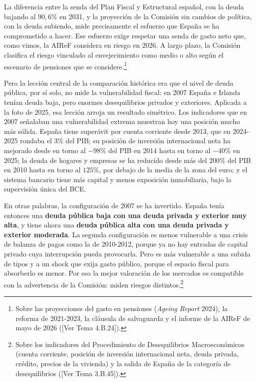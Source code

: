 \documentclass[10pt,a4paper]{article}
\newcommand{\authorfont}[1]{{\fontfamily{EBGaramond-TLF}\selectfont #1}}
\begin{document}
La diferencia entre la senda del Plan Fiscal y Estructural español, con la deuda bajando al $90,6\%$ en 2031, y la proyección de la Comisión sin cambios de política, con la deuda subiendo, mide precisamente el esfuerzo que España se ha comprometido a hacer. Ese esfuerzo exige respetar una senda de gasto neto que, como vimos, la AIReF considera en riesgo en 2026. A largo plazo, la Comisión clasifica el riesgo vinculado al envejecimiento como medio o alto según el escenario de pensiones que se considere.\footnote{%
    Sobre las proyecciones del gasto en pensiones (\textit{Ageing Report} 2024), la reforma de 2021-2023, la cláusula de salvaguarda y el informe de la AIReF de mayo de 2026 ([\authorfont{Ver Tema 4.B.24}]).
}

Pero la lección central de la comparación histórica era que el nivel de deuda pública, por sí solo, no mide la vulnerabilidad fiscal: en 2007 España e Irlanda tenían deuda baja, pero enormes desequilibrios privados y exteriores. Aplicada a la foto de 2025, esa lección arroja un resultado simétrico. Los indicadores que en 2007 señalaban una vulnerabilidad extrema muestran hoy una posición mucho más sólida. España tiene superávit por cuenta corriente desde 2013, que en 2024-2025 rondaba el $3\%$ del PIB; su posición de inversión internacional neta ha mejorado desde en torno al $-98\%$ del PIB en 2014 hasta en torno al $-40\%$ en 2025; la deuda de hogares y empresas se ha reducido desde más del $200\%$ del PIB en 2010 hasta en torno al $125\%$, por debajo de la media de la zona del euro; y el sistema bancario tiene más capital y menos exposición inmobiliaria, bajo la supervisión única del BCE.

En otras palabras, la configuración de 2007 se ha invertido. España tenía entonces una \textbf{deuda pública baja con una deuda privada y exterior muy alta}, y tiene ahora una \textbf{deuda pública alta con una deuda privada y exterior moderada}. La segunda configuración es menos vulnerable a una crisis de balanza de pagos como la de 2010-2012, porque ya no hay entradas de capital privado cuya interrupción pueda provocarla. Pero es más vulnerable a una subida de tipos y a un shock que exija gasto público, porque el espacio fiscal para absorberlo es menor. Por eso la mejor valoración de los mercados es compatible con la advertencia de la Comisión: miden riesgos distintos.\footnote{%
    Sobre los indicadores del Procedimiento de Desequilibrios Macroeconómicos (cuenta corriente, posición de inversión internacional neta, deuda privada, crédito, precios de la vivienda) y la salida de España de la categoría de desequilibrios ([\authorfont{Ver Tema 3.B.45}]).
}
\end{document}

